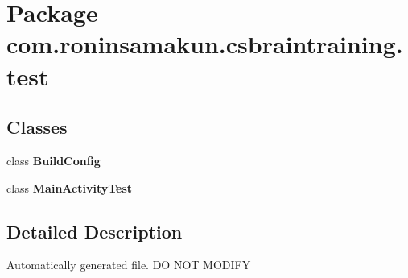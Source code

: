 \section{Package com.\+roninsamakun.\+csbraintraining.\+test}
\label{namespacecom_1_1roninsamakun_1_1csbraintraining_1_1test}
\subsection*{Classes}
\begin{DoxyCompactItemize}
\item 
class {\bf Build\+Config}
\item 
class {\bf Main\+Activity\+Test}
\end{DoxyCompactItemize}


\subsection{Detailed Description}
Automatically generated file. D\+O N\+O\+T M\+O\+D\+I\+F\+Y 